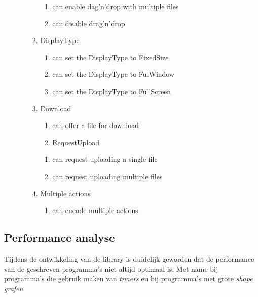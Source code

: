 \begin{enumerate}[{T}1]
\begin{enumerate}
\begin{enumerate}
\begin{enumerate}
            	\item can enable dag'n'drop with multiple files
            	\item can disable drag'n'drop
            \end{enumerate}
            \item DisplayType
	        \begin{enumerate}
            	\item can set the DisplayType to FixedSize
            	\item can set the DisplayType to FulWindow
            	\item can set the DisplayType to FullScreen
            \end{enumerate}
            \item Download
	        \begin{enumerate}
            	\item can offer a file for download
	            \item RequestUpload
            \end{enumerate}
	        \begin{enumerate}
            	\item can request uploading a single file
            	\item can request uploading multiple files
            \end{enumerate}
            \item Multiple actions
	        \begin{enumerate}
        		\item can encode multiple actions
	        \end{enumerate}
        \end{enumerate}
	\end{enumerate}
	\setcounter{startvaluetest}{\value{enumi}}
\end{enumerate}

\subsection{Performance analyse}
Tijdens de ontwikkeling van de library is duidelijk geworden dat de performance van de geschreven programma's niet altijd optimaal is. Met name bij programma's die gebruik maken van \emph{timers} en bij programma's met grote \emph{shape grafen}.

